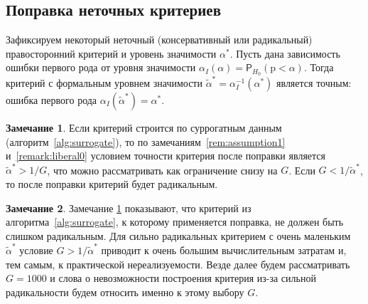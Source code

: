 \documentclass[specialist,
substylefile = spbu_report.rtx,
subf,href,colorlinks=true, 12pt]{disser}
\theoremstyle{definition}
\newtheorem{algorithm}{Алгоритм}
\newtheorem{remark}{Замечание}
\newtheorem{assumption}{Предположение}
\begin{document}
\subsection{Поправка неточных критериев}\label{sect:correction}
Зафиксируем некоторый неточный (консервативный или радикальный) правосторонний критерий и уровень значимости $\alpha^*$. Пусть дана зависимость ошибки первого рода от уровня значимости $\alpha_I(\alpha)=\mathsf P_{H_0}(\mathrm p < \alpha)$.
Тогда критерий с формальным уровнем значимости $\widetilde\alpha^*=\alpha_I^{-1}(\alpha^*)$ является точным: ошибка первого рода $\alpha_I(\widetilde\alpha^*)=\alpha^*$.
\begin{remark}
\label{remark:liberal1}
	Если критерий строится по суррогатным данным (алгоритм~\ref{alg:surrogate}), то по замечаниям~\ref{rem:assumption1} и~\ref{remark:liberal0} условием точности критерия после поправки является $\widetilde\alpha^* > 1/G$, что можно рассматривать как ограничение снизу на $G$. Если $G < 1/\widetilde\alpha^*$, то после поправки критерий будет радикальным.
\end{remark}

\begin{remark}\label{remark:liberal}
Замечание \ref{remark:liberal1} показывают, что критерий из алгоритма~\ref{alg:surrogate}, к которому применяется поправка, не должен быть слишком радикальным. Для сильно радикальных критерием с очень маленьким $\widetilde\alpha^*$ условие $G > 1/\widetilde\alpha^*$ приводит к очень большим вычислительным затратам и, тем самым, к практической нереализуемости. Везде далее будем рассматривать $G=1000$ и слова о невозможности построения критерия из-за сильной радикальности будем относить именно к этому выбору $G$.
\end{remark}
\end{document}
